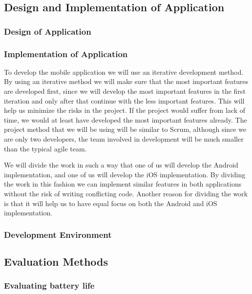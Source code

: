 \documentclass[12pt, a4paper, onecolumn]{article}
\begin{document}
\subsection{Design and Implementation of Application}

\subsubsection{Design of Application}

\subsubsection{Implementation of Application}

To develop the mobile application we will use an iterative development method. By using an iterative method we will make sure that the most important features are developed first, since we will develop the most important features in the first iteration and only after that continue with the less important features. This will help us  minimize the risks in the project. If the project would suffer from lack of time, we would at least have developed the most important features already. The project method that we will be using will be similar to Scrum, although since we are only two developers, the team involved in development will be much smaller than the typical agile team.

We will divide the work in such a way that one of us will develop the Android implementation, and one of us will develop the iOS implementation. By dividing the work in this fashion we can implement similar features in both applications without the risk of writing conflicting code. Another reason for dividing the work is that it will help us to have equal focus on both the Android and iOS implementation.

\subsubsection{Development Environment}

\subsection{Evaluation Methods}

\subsubsection{Evaluating battery life}
\end{document}
